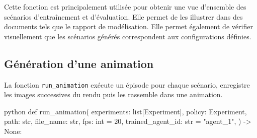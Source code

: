 \noindent Cette fonction est principalement utilisée pour obtenir une vue d'ensemble des scénarios d'entraînement et d'évaluation. Elle permet de les illustrer dans des documents tels que le rapport de modélisation. Elle permet également de vérifier visuellement que les scénarios générés correspondent aux configurations définies.

\subsection{Génération d'une animation}

\noindent La fonction \texttt{run\_animation} exécute un épisode pour chaque scénario, enregistre les images successives du rendu puis les rassemble dans une animation.

\begin{codebox}{python}
def run_animation(
    experiments: list[Experiment],
    policy: Experiment,
    path: str,
    file_name: str,
    fps: int = 20,
    trained_agent_id: str = "agent_1",
) -> None:
\end{codebox}

